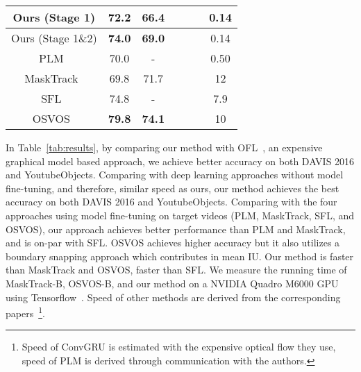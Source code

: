 \documentclass[10pt,twocolumn,letterpaper]{article}
\newcommand{\cmark}{\ding{51}}\newcommand{\xmark}{\ding{55}}
\begin{document}
\begin{table*}[t]
\begin{tabular}{|c|c|c|c|c|c|c|}
Ours (Stage 1)      & 72.2     & 66.4        & \xmark  &  \xmark                           &       \xmark                      & 0.14 \\ \hline
Ours (Stage 1\&2)      & \textbf{74.0}     & \textbf{69.0}        & \xmark  &  \xmark                       &       \xmark                      & 0.14  \\
\hhline{|=|=|=|=|=|=|=|}
PLM~\cite{Shin2017pixel}       & 70.0     & -           & \cmark  &   \xmark                          &          \xmark                   & 0.50                                                   \\ \hline
MaskTrack~\cite{Perazzi2017masktrack} & 69.8     & 71.7        & \cmark  &   \xmark                          &      \xmark                       & 12                                                  \\ \hline
SFL~\cite{Cheng2017segflow}     & 74.8     & -        & \cmark  &   \cmark                          &        \xmark                     & 7.9                                                \\ \hline
OSVOS~\cite{Caelles2017osvos}     & \textbf{79.8}     & \textbf{74.1}        & \cmark  & \xmark                            &       \xmark                      & 10                                                  \\ \hline
\end{tabular}
\end{table*}

In Table~\ref{tab:results}, by comparing our method with OFL~\cite{Tsai2016objflow}, an expensive graphical model based approach, we achieve better accuracy on both DAVIS 2016 and YoutubeObjects. Comparing with deep learning approaches without model fine-tuning, and therefore, similar speed as ours, our method achieves the best accuracy on both DAVIS 2016 and YoutubeObjects. Comparing with the four approaches using model fine-tuning on target videos (PLM, MaskTrack, SFL, and OSVOS), our approach achieves better performance than PLM and MaskTrack, and is on-par with SFL. OSVOS achieves higher accuracy but it also utilizes a boundary snapping approach which contributes  in mean IU. Our method is  faster than MaskTrack and OSVOS,  faster than SFL. We measure the running time of MaskTrack-B, OSVOS-B, and our method on a NVIDIA Quadro M6000 GPU using Tensorflow~\cite{tensorflow2015}. Speed of other methods are derived from the corresponding papers~\footnote{Speed of ConvGRU is estimated with the expensive optical flow they use, speed of PLM is derived through communication with the authors.}.
\end{document}
